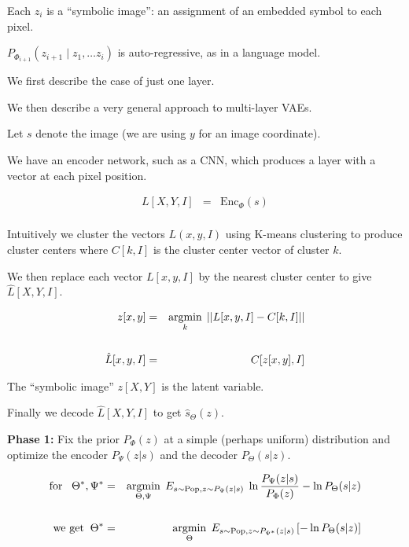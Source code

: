{{\vfill
Each $z_i$ is a ``symbolic image'': an assignment of an embedded symbol to each pixel.

\vfill
$P_{\Phi_{i+1}}(z_{i+1}\;|\; z_1,\ldots z_i)$ is auto-regressive, as in a language model.

}


We first describe the case of just one layer.

\vfill
We then describe a very general approach to multi-layer VAEs.


Let $s$ denote the image (we are using $y$ for an image coordinate).

\vfill
We have an encoder network, such as a CNN, which produces a layer with a vector at each pixel position.

\begin{eqnarray*}
L[X,Y,I] & = & \mathrm{Enc}_\Phi(s) \\
\end{eqnarray*}

Intuitively we cluster the vectors $L(x,y,I)$ using K-means clustering to produce cluster centers where $C[k,I]$
is the cluster center vector of cluster $k$.


We then replace each vector $L[x,y,I]$ by the nearest cluster center to give $\hat{L}[X,Y,I]$.

{\huge
\begin{eqnarray*}
z[x,y] & = & \operatorname*{argmin}_k \;||L[x,y,I] - C[k,I]|| \\
\\
\hat{L}[x,y,I] & = & C[z[x,y],I] \\
\end{eqnarray*}
}

The ``symbolic image'' $z[X,Y]$ is the latent variable.


Finally we decode $\hat{L}[X,Y,I]$ to get $\hat{s}_\Theta(z)$.


{\huge
{\bf Phase 1:} Fix the prior $P_\Phi(z)$ at a simple (perhaps uniform) distribution and optimize the encoder $P_\Psi(z|s)$ and the decoder $P_\Theta(s|z)$.

\begin{eqnarray*}
\mbox{for}\;\;\;\Theta^*,\Psi^* &  = & \operatorname*{argmin}_{\Theta,\Psi}\;E_{s\sim \mathrm{Pop},z\sim P_\Psi(z|s)}  \;\ln \frac{P_\Psi(z|s)}{P_\Phi(z)}  - \ln P_\Theta(s|z)
\\
\\
\mbox{we get}\;\;\Theta^* & = & \operatorname*{argmin}_\Theta\;E_{s \sim \mathrm{Pop},z \sim P_{\Psi^*}(z|s)}\left[-\ln P_\Theta(s|z)\right]
\end{eqnarray*}

}}
